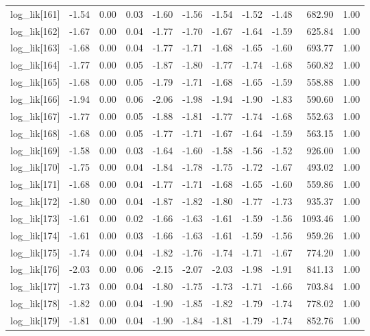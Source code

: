 \begin{table}[ht]
\begin{tabular}{rrrrrrrrrrr}
  log\_lik[161] & -1.54 & 0.00 & 0.03 & -1.60 & -1.56 & -1.54 & -1.52 & -1.48 & 682.90 & 1.00 \\ 
  log\_lik[162] & -1.67 & 0.00 & 0.04 & -1.77 & -1.70 & -1.67 & -1.64 & -1.59 & 625.84 & 1.00 \\ 
  log\_lik[163] & -1.68 & 0.00 & 0.04 & -1.77 & -1.71 & -1.68 & -1.65 & -1.60 & 693.77 & 1.00 \\ 
  log\_lik[164] & -1.77 & 0.00 & 0.05 & -1.87 & -1.80 & -1.77 & -1.74 & -1.68 & 560.82 & 1.00 \\ 
  log\_lik[165] & -1.68 & 0.00 & 0.05 & -1.79 & -1.71 & -1.68 & -1.65 & -1.59 & 558.88 & 1.00 \\ 
  log\_lik[166] & -1.94 & 0.00 & 0.06 & -2.06 & -1.98 & -1.94 & -1.90 & -1.83 & 590.60 & 1.00 \\ 
  log\_lik[167] & -1.77 & 0.00 & 0.05 & -1.88 & -1.81 & -1.77 & -1.74 & -1.68 & 552.63 & 1.00 \\ 
  log\_lik[168] & -1.68 & 0.00 & 0.05 & -1.77 & -1.71 & -1.67 & -1.64 & -1.59 & 563.15 & 1.00 \\ 
  log\_lik[169] & -1.58 & 0.00 & 0.03 & -1.64 & -1.60 & -1.58 & -1.56 & -1.52 & 926.00 & 1.00 \\ 
  log\_lik[170] & -1.75 & 0.00 & 0.04 & -1.84 & -1.78 & -1.75 & -1.72 & -1.67 & 493.02 & 1.00 \\ 
  log\_lik[171] & -1.68 & 0.00 & 0.04 & -1.77 & -1.71 & -1.68 & -1.65 & -1.60 & 559.86 & 1.00 \\ 
  log\_lik[172] & -1.80 & 0.00 & 0.04 & -1.87 & -1.82 & -1.80 & -1.77 & -1.73 & 935.37 & 1.00 \\ 
  log\_lik[173] & -1.61 & 0.00 & 0.02 & -1.66 & -1.63 & -1.61 & -1.59 & -1.56 & 1093.46 & 1.00 \\ 
  log\_lik[174] & -1.61 & 0.00 & 0.03 & -1.66 & -1.63 & -1.61 & -1.59 & -1.56 & 959.26 & 1.00 \\ 
  log\_lik[175] & -1.74 & 0.00 & 0.04 & -1.82 & -1.76 & -1.74 & -1.71 & -1.67 & 774.20 & 1.00 \\ 
  log\_lik[176] & -2.03 & 0.00 & 0.06 & -2.15 & -2.07 & -2.03 & -1.98 & -1.91 & 841.13 & 1.00 \\ 
  log\_lik[177] & -1.73 & 0.00 & 0.04 & -1.80 & -1.75 & -1.73 & -1.71 & -1.66 & 703.84 & 1.00 \\ 
  log\_lik[178] & -1.82 & 0.00 & 0.04 & -1.90 & -1.85 & -1.82 & -1.79 & -1.74 & 778.02 & 1.00 \\ 
  log\_lik[179] & -1.81 & 0.00 & 0.04 & -1.90 & -1.84 & -1.81 & -1.79 & -1.74 & 852.76 & 1.00 \\ 

\end{tabular}
\end{table}

